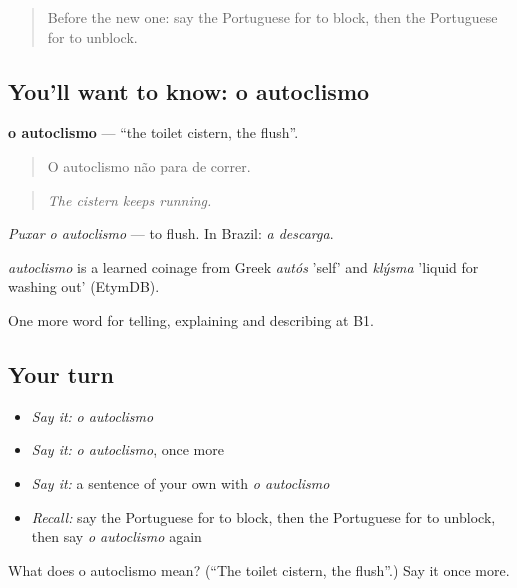\label{lesson:PT-C430-autoclismo}



\begin{quote}
Before the new one: say the Portuguese for to block, then the Portuguese for to unblock.
\end{quote}

\subsection*{You'll want to know: o autoclismo}
\textbf{o autoclismo} — \textquotedblleft{}the toilet cistern, the flush\textquotedblright{}.

\begin{quote}
O autoclismo não para de correr.
\end{quote}

\begin{quote}
\emph{The cistern keeps running.}
\end{quote}

\emph{Puxar o autoclismo} — to flush. In Brazil: \emph{a descarga}.

\begin{cousinweb}
\emph{autoclismo} is a learned coinage from Greek \emph{autós} 'self' and \emph{klýsma} 'liquid for washing out' (EtymDB).
\end{cousinweb}

\begin{grammarlens}[title={What you've built}]
One more word for telling, explaining and describing at B1.
\end{grammarlens}

\subsection*{Your turn}
\begin{itemize}
\raggedright
  \item \emph{Say it:} \emph{o autoclismo}
  \item \emph{Say it:} \emph{o autoclismo}, once more
  \item \emph{Say it:} a sentence of your own with \emph{o autoclismo}
  \item \emph{Recall:} say the Portuguese for to block, then the Portuguese for to unblock, then say \emph{o autoclismo} again
\end{itemize}

\begin{tcolorbox}[breakable,colback=teal!4,colframe=teal!35!black,title={Before you move on}]
What does o autoclismo mean? (\textquotedblleft{}The toilet cistern, the flush\textquotedblright{}.) Say it once more.
\end{tcolorbox}

